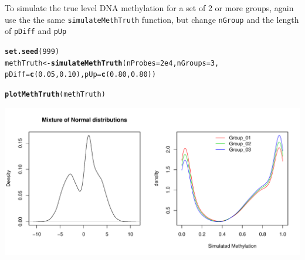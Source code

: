 \documentclass{article}\usepackage[]{graphicx}\usepackage[usenames,dvipsnames]{color}
\makeatletter
\def\maxwidth{ %
  \ifdim\Gin@nat@width>\linewidth
    \linewidth
  \else
    \Gin@nat@width
  \fi
}
\newcommand{\hlnum}[1]{\textcolor[rgb]{0.686,0.059,0.569}{#1}}%
\newcommand{\hlstd}[1]{\textcolor[rgb]{0.345,0.345,0.345}{#1}}%
\newcommand{\hlkwb}[1]{\textcolor[rgb]{0.69,0.353,0.396}{#1}}%
\newcommand{\hlkwc}[1]{\textcolor[rgb]{0.333,0.667,0.333}{#1}}%
\newcommand{\hlkwd}[1]{\textcolor[rgb]{0.737,0.353,0.396}{\textbf{#1}}}%
\newenvironment{kframe}{%
 \def\at@end@of@kframe{}%
 \ifinner\ifhmode%
  \def\at@end@of@kframe{\end{minipage}}%
  \begin{minipage}{\columnwidth}%
 \fi\fi%
 \def\FrameCommand##1{\hskip\@totalleftmargin \hskip-\fboxsep
 \colorbox{shadecolor}{##1}\hskip-\fboxsep
     \hskip-\linewidth \hskip-\@totalleftmargin \hskip\columnwidth}%
 \MakeFramed {\advance\hsize-\width
   \@totalleftmargin\z@ \linewidth\hsize
   \@setminipage}}%
 {\par\unskip\endMakeFramed%
 \at@end@of@kframe}
\newenvironment{knitrout}{}{} %
\makeatother
\begin{document}
To simulate the true level DNA methylation for a set of 2 or more groups, 
again use the the same \texttt{simulateMethTruth} function, but change 
\texttt{nGroup} and the length of \texttt{pDiff} and \texttt{pUp} 
\begin{knitrout}
\color{fgcolor}\begin{kframe}
\begin{alltt}
\hlkwd{set.seed}\hlstd{(}\hlnum{999}\hlstd{)}
\hlstd{methTruth} \hlkwb{<-} \hlkwd{simulateMethTruth}\hlstd{(}\hlkwc{nProbes} \hlstd{=} \hlnum{2e4}\hlstd{,} \hlkwc{nGroups} \hlstd{=} \hlnum{3}\hlstd{,}
                               \hlkwc{pDiff} \hlstd{=} \hlkwd{c}\hlstd{(}\hlnum{0.05}\hlstd{,} \hlnum{0.10}\hlstd{),} \hlkwc{pUp} \hlstd{=} \hlkwd{c}\hlstd{(}\hlnum{0.80}\hlstd{,} \hlnum{0.80}\hlstd{))}
\end{alltt}


{\ttfamily\noindent\itshape\color{messagecolor}{\#\# [quantroSim]: Simulating a mixture of 3 Normal distributions \\\#\#\ \ \ \ \ \ \ \ \ \ \ \  with mean (-3, 1, 3) and standard deviation (3, 0.4, 3)}}\begin{alltt}
\hlkwd{plotMethTruth}\hlstd{(methTruth)}
\end{alltt}
\end{kframe}
\includegraphics[width=\maxwidth]{figure/methTruth-Fig-3groups-1} 

\end{knitrout}
\end{document}
